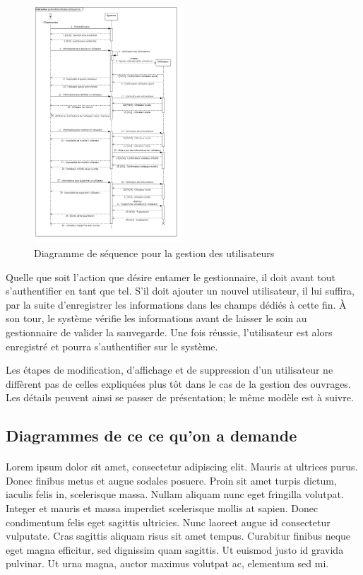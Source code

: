 \paragraph{}
\begin{figure}[h]
        \centering
        \includegraphics[width=0.5\textwidth]{gestionDesUtilisateursSequence}
        \caption{Diagramme de séquence pour la gestion des utilisateurs}
        \label{image-gestionDesUtilisateursSequence}
        \end{figure}
\par
Quelle que soit l'action que désire entamer le gestionnaire, il doit avant tout s'authentifier
en tant que tel. S'il doit ajouter un nouvel utilisateur, il lui suffira, par la suite 
d'enregistrer les informations dans les champs dédiés à cette fin. À son tour, le système 
vérifie les informations avant de laisser le soin au gestionnaire de valider la sauvegarde.
Une fois réussie, l'utilisateur est alors enregistré et pourra s'authentifier sur le 
système. \par 
Les étapes de modification, d'affichage et de suppression d'un utilisateur ne diffèrent 
pas de celles expliquées plus tôt dans le cas de la gestion des ouvrages. Les détails 
peuvent ainsi se passer de présentation; le même modèle est à suivre.

\subsection{Diagrammes de ce ce qu'on a demande}
\paragraph{} 
Lorem ipsum dolor sit amet, consectetur adipiscing elit. Mauris at ultrices purus. Donec finibus metus et augue sodales posuere. Proin sit amet turpis dictum, iaculis felis in, scelerisque massa. Nullam aliquam nunc eget fringilla volutpat. Integer et mauris et massa imperdiet scelerisque mollis at sapien. Donec condimentum felis eget sagittis ultricies. Nunc laoreet augue id consectetur vulputate. Cras sagittis aliquam risus sit amet tempus. Curabitur finibus neque eget magna efficitur, sed dignissim quam sagittis. Ut euismod justo id gravida pulvinar. Ut urna magna, auctor maximus volutpat ac, elementum sed mi.
